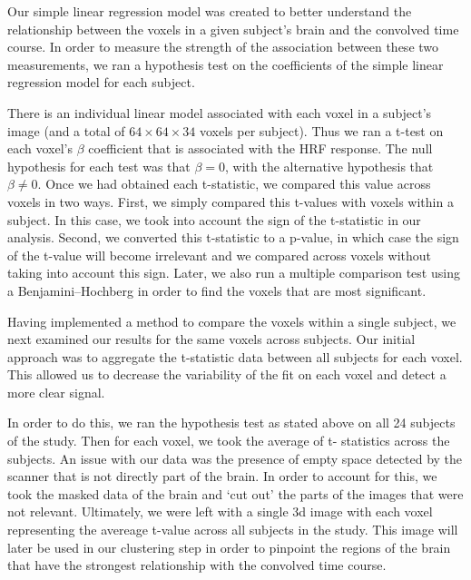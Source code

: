 \par \indent Our simple linear regression model was created to better
understand the relationship between the voxels in a given subject's brain and
the convolved time course. In order to measure the strength of the association
between these two measurements, we ran a hypothesis test on the coefficients of
the simple linear regression model for each subject.

\par There is an individual linear model associated with each voxel in a
subject’s image (and a total of $64 \times 64 \times 34$ voxels per subject).
Thus we ran a t-test on each voxel's $\beta$ coefficient that is associated
with the HRF response. The null hypothesis for each test was that $ \beta = 0$,
with the alternative hypothesis that $\beta \neq 0$. Once we had obtained each
t-statistic, we compared this value across voxels in two ways. First, we simply
compared this t-values with voxels within a subject. In this case, we took into
account the sign of the t-statistic in our analysis. Second, we converted this
t-statistic to a p-value, in which case the sign of the t-value will become
irrelevant and we compared across voxels without taking into account this sign.
Later, we also run a multiple comparison test using a Benjamini–Hochberg in
order to find the voxels that are most significant.

\par Having implemented a method to compare the voxels within a single subject,
we next examined our results for the same voxels across subjects. Our initial
approach was to aggregate the t-statistic data between all subjects for each
voxel. This allowed us to decrease the variability of the fit on each voxel and
detect a more clear signal.

\par In order to do this, we ran the hypothesis test as stated above on all 24
subjects of the study. Then for each voxel, we took the average of t-
statistics across the subjects. An issue with our data was the presence of
empty space detected by the scanner that is not directly part of the brain. In
order to account for this, we took the masked data of the brain and ‘cut out’
the parts of the images that were not relevant. Ultimately, we were left with a
single 3d image with each voxel representing the avereage t-value across all
subjects in the study. This image will later be used in our clustering step in
order to pinpoint the regions of the brain that have the strongest relationship
with the convolved time course.
